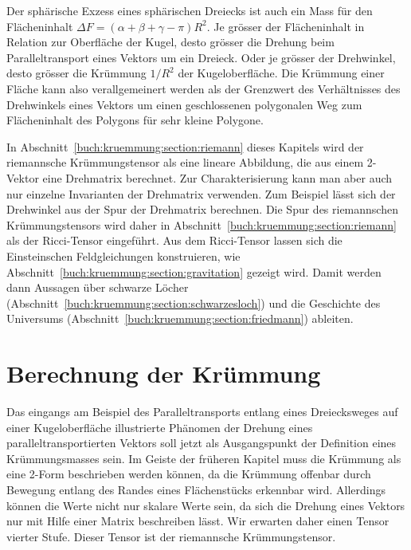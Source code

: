 Der sphärische Exzess eines sphärischen Dreiecks ist auch ein Mass für
den Flächeninhalt $\Delta F = (\alpha+\beta+\gamma-\pi)R^2$.
Je grösser der Flächeninhalt in Relation zur Oberfläche der Kugel,
desto grösser die Drehung beim Paralleltransport eines Vektors um
ein Dreieck.
Oder je grösser der Drehwinkel, desto grösser die Krümmung $1/R^2$
der Kugeloberfläche.
Die Krümmung einer Fläche kann also verallgemeinert werden als
der Grenzwert des Verhältnisses des Drehwinkels eines Vektors um einen
geschlossenen polygonalen Weg zum Flächeninhalt des Polygons für
sehr kleine Polygone.

In Abschnitt~\ref{buch:kruemmung:section:riemann} dieses Kapitels
wird der riemannsche Krümmungstensor als eine lineare Abbildung,
die aus einem 2-Vektor eine Drehmatrix berechnet.
Zur Charakterisierung kann man aber auch nur einzelne Invarianten
der Drehmatrix verwenden.
Zum Beispiel lässt sich der Drehwinkel aus der Spur der Drehmatrix
berechnen.
Die Spur des riemannschen Krümmungstensors wird daher in 
Abschnitt~\ref{buch:kruemmung:section:riemann} als der Ricci-Tensor
eingeführt.
Aus dem Ricci-Tensor lassen sich die Einsteinschen Feldgleichungen
konstruieren, wie Abschnitt~\ref{buch:kruemmung:section:gravitation}
gezeigt wird.
Damit werden dann Aussagen über schwarze Löcher
(Abschnitt~\ref{buch:kruemmung:section:schwarzesloch})
und die Geschichte des Universums
(Abschnitt~\ref{buch:kruemmung:section:friedmann})
ableiten.

%
%
\section{Berechnung der Krümmung
\label{buch:kruemmung:section:riemann}}
Das eingangs am Beispiel des Paralleltransports entlang eines
Dreiecksweges auf einer Kugeloberfläche illustrierte Phänomen
der Drehung eines paralleltransportierten Vektors soll jetzt
als Ausgangspunkt der Definition eines Krümmungsmasses sein.
Im Geiste der früheren Kapitel muss die Krümmung als eine 2-Form
beschrieben werden können, da die Krümmung offenbar durch Bewegung
entlang des Randes eines Flächenstücks erkennbar wird.
Allerdings können die Werte nicht nur skalare Werte sein, da
sich die Drehung eines Vektors nur mit Hilfe einer Matrix
beschreiben lässt.
Wir erwarten daher einen Tensor vierter Stufe.
Dieser Tensor ist der riemannsche Krümmungstensor.

%
%
